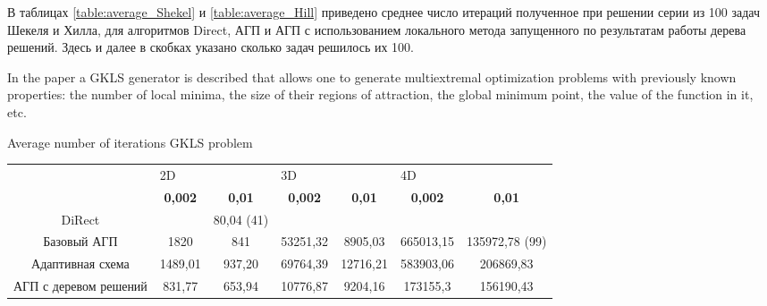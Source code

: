 \documentclass[entropy,article,submit,moreauthors,pdftex]{Definitions/mdpi}
\begin{document}
В таблицах \ref{table:average_Shekel} и \ref{table:average_Hill} приведено среднее число итераций полученное при решении серии из 100 задач Шекеля и Хилла, для алгоритмов Direct, АГП и АГП с использованием локального метода запущенного по результатам работы дерева решений. Здесь и далее в скобках указано сколько задач решилось их 100.


In the paper \cite{Gaviano2003} a GKLS generator is described that allows one to generate multiextremal optimization problems with previously known properties: the number of local minima, the size of their regions of attraction, the global minimum point, the value of the function in it, etc.

\begin{specialtable}[H] 
	\caption{Average number of iterations GKLS problem}\label{table:average_GKLS}
	\center
\begin{tabular}{ccccccc}
\hline\noalign{\smallskip}
\toprule

                      & \multicolumn{2}{l}{2D}                                                          & \multicolumn{2}{l}{3D}                                                          & \multicolumn{2}{l}{4D}                                  \\
                      & \textbf{0,002} & \textbf{0,01} & \textbf{0,002} & \textbf{0,01} & \textbf{0,002} & \textbf{0,01} \\
					  \midrule
DiRect                &                                        & 80,04 (41)                            &                                        &                                       &                &                                       \\
Базовый АГП           & 1820                                   & 841                                   & 53251,32                               & 8905,03                               & 665013,15      & 135972,78 (99)                        \\
Адаптивная схема      & 1489,01                                & 937,20                                & 69764,39                               & 12716,21                              & 583903,06      & 206869,83                             \\
АГП с деревом решений & 831,77                                 & 653,94                                & 10776,87                               & 9204,16                               & 173155,3       & 156190,43                              \\
\bottomrule
\end{tabular}
\end{specialtable}
\end{document}
